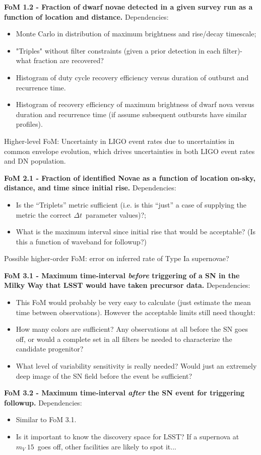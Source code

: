 {\bf FoM 1.2 - Fraction of dwarf novae detected in a given survey
  run as a function of location and distance.}
Dependencies:
\begin{itemize}
  \item Monte Carlo in distribution of maximum brightness and rise/decay timescale;
    \item "Triples" without filter constraints (given a prior detection in each filter)- what fraction are recovered?
    \item Histogram of duty cycle recovery efficiency versus duration of outburst and recurrence time.
    \item Histogram of recovery efficiency of maximum brightness of dwarf nova versus duration and recurrence time (if assume subsequent outbursts have similar profiles).
    \end{itemize}
Higher-level FoM: Uncertainty in LIGO event rates due to
uncertainties in common envelope evolution, which drives uncertainties in both LIGO event rates and DN population.

{\bf FoM 2.1 - Fraction of identified Novae as a function of location on-sky, distance, and time since initial rise.}
Dependencies:
\begin{itemize}
  \item Is the ``Triplets'' metric sufficient (i.e. is this ``just'' a case of supplying the metric the correct $\Delta t$~parameter values)?;
    \item What is the maximum interval since initial rise that would be acceptable? (Is this a function of waveband for followup?)
\end{itemize}
Possible higher-order FoM: error on inferred rate of Type Ia supernovae?

{\bf FoM 3.1 - Maximum time-interval {\it before} triggering of a SN in the Milky Way that LSST would have taken precursor data.}
Dependencies:
\begin{itemize}
  \item This FoM would probably be very easy to calculate (just estimate the mean time between observations). However the acceptable limits still need thought:
  \item How many colors are sufficient? Any observations at all before the SN goes off, or would a complete set in all filters be needed to characterize the candidate progenitor?
    \item What level of variability sensitivity is really needed? Would just an extremely deep image of the SN field before the event be sufficient?
\end{itemize}
{\bf FoM 3.2 - Maximum time-interval {\it after} the SN event for triggering followup.}
Dependencies:
\begin{itemize}
  \item Similar to FoM 3.1. 
    \item Is it important to know the discovery space for LSST? If a
      supernova at $m_V~15$~goes off, other facilities are likely to
      spot it...
\end{itemize}


